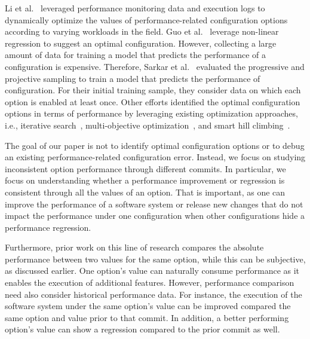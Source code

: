 Li et al.~\cite{LiAutoConfig} leveraged performance monitoring data and execution logs to dynamically optimize the values of performance-related configuration options according to varying workloads in the field. Guo et al.~\cite{RN3544} leverage non-linear regression to suggest an optimal configuration. However, collecting a large amount of data for training a model that predicts the performance of a configuration is expensive. Therefore, Sarkar et al.~\cite{RN3089} evaluated the progressive and projective sampling to train a model that predicts the performance of configuration. For their initial training sample, they consider data on which each option is enabled at least once. Other efforts identified the optimal configuration options in terms of performance by leveraging existing optimization approaches, i.e., iterative search~\cite{RN3545}, multi-objective optimization~\cite{singh2016optimizing}, and smart hill climbing~\cite{RN3518}.


The goal of our paper is not to identify optimal configuration options or to debug an existing performance-related configuration error. Instead, we focus on studying inconsistent option performance through different commits. In particular, we focus on understanding whether a performance improvement or regression is consistent through all the values of an option. That is important, as one can improve the performance of a software system or release new changes that do not impact the performance under one configuration when other configurations hide a performance regression. 

Furthermore, prior work on this line of research compares the absolute performance between two values for the same option, while this can be subjective, as discussed earlier. One option's value can naturally consume performance as it enables the execution of additional features. However, performance comparison need also consider historical performance data. For instance, the execution of the software system under the same option's value can be improved %
compared the same option and value prior to that commit. In addition, a better performing option's value can show a regression compared to the prior commit as well. %

